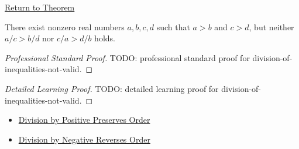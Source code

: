 \newpage
{}
\label{prf:division-of-inequalities-not-valid}

\begin{remark*}[Return]
\hyperref[prop:division-of-inequalities-not-valid]{Return to Theorem}
\end{remark*}

\begin{proposition*}
There exist nonzero real numbers $a,b,c,d$ such that $a>b$ and $c>d$, but
neither $a/c>b/d$ nor $c/a>d/b$ holds.
\end{proposition*}

\begin{proof}[Professional Standard Proof]
\LRAProofBodyStart
TODO: professional standard proof for division-of-inequalities-not-valid.
\end{proof}

\begin{proof}[Detailed Learning Proof]
\LRAProofBodyStart
TODO: detailed learning proof for division-of-inequalities-not-valid.
\end{proof}

\begin{remark*}
\end{remark*}

\begin{dependencies}
\begin{itemize}
  \item \hyperref[lem:division-by-positive-preserves-order]{Division by Positive Preserves Order}
  \item \hyperref[lem:division-by-negative-reverses-order]{Division by Negative Reverses Order}
\end{itemize}
\end{dependencies}

\clearpage

